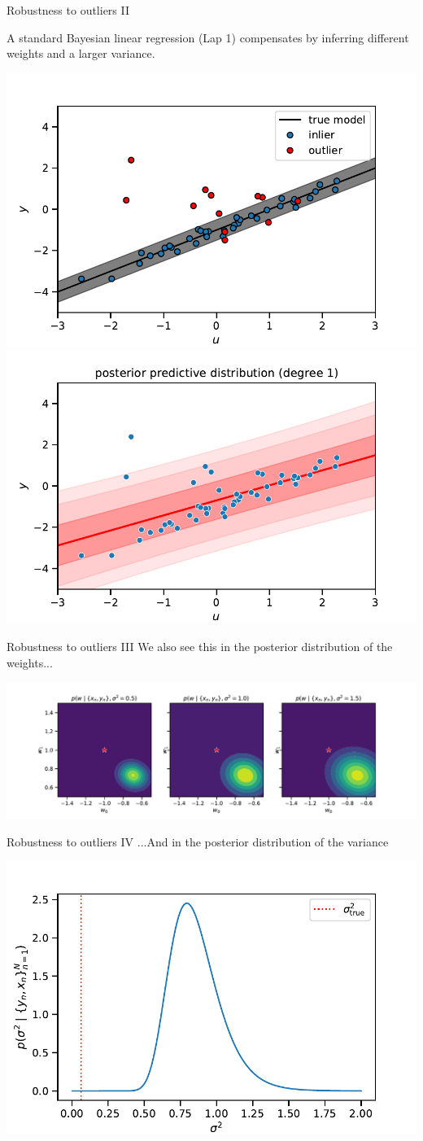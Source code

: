 \documentclass[aspectratio=169]{beamer}
\begin{document}
\begin{frame}{Robustness to outliers II}

A standard Bayesian linear regression (Lap 1) compensates by inferring different weights and a larger variance.

\centering
\includegraphics[width=.49\textwidth]{figures/lap3/data.pdf}
\includegraphics[width=.49\textwidth]{figures/lap3/post_pred.pdf}

\end{frame}

\begin{frame}{Robustness to outliers III}
We also see this in the posterior distribution of the weights...

\centering
\includegraphics[width=.9\textwidth]{figures/lap3/w_post.pdf}
\end{frame}

\begin{frame}{Robustness to outliers IV}
...And in the posterior distribution of the variance

\centering
\includegraphics[width=.5\textwidth]{figures/lap3/sigmasq_post.pdf}
\end{frame}
\end{document}
